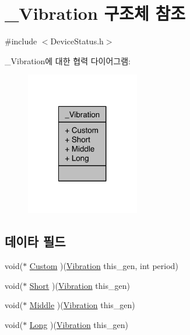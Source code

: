\hypertarget{struct___vibration}{\section{\-\_\-\-Vibration 구조체 참조}
\label{struct___vibration}
}


{\ttfamily \#include $<$Device\-Status.\-h$>$}



\-\_\-\-Vibration에 대한 협력 다이어그램\-:\nopagebreak
\begin{figure}[H]
\begin{center}
\leavevmode
\includegraphics[width=140pt]{d6/d96/struct___vibration__coll__graph}
\end{center}
\end{figure}
\subsection*{데이타 필드}
\begin{DoxyCompactItemize}
\item 
void($\ast$ \hyperlink{struct___vibration_abc4c454bcd72f75161a47f4fde1fbf55}{Custom} )(\hyperlink{namespace_3global_scope_4_d1/d55/struct_vibration}{Vibration} this\-\_\-gen, int period)
\item 
void($\ast$ \hyperlink{struct___vibration_adba0d5d39af26335d9e3ee022750e763}{Short} )(\hyperlink{namespace_3global_scope_4_d1/d55/struct_vibration}{Vibration} this\-\_\-gen)
\item 
void($\ast$ \hyperlink{struct___vibration_a9d7417431ae33a9f09ca9eda0bb1ec0e}{Middle} )(\hyperlink{namespace_3global_scope_4_d1/d55/struct_vibration}{Vibration} this\-\_\-gen)
\item 
void($\ast$ \hyperlink{struct___vibration_a56bc06cfa0b7643653989b91d9524f46}{Long} )(\hyperlink{namespace_3global_scope_4_d1/d55/struct_vibration}{Vibration} this\-\_\-gen)
\end{DoxyCompactItemize}


